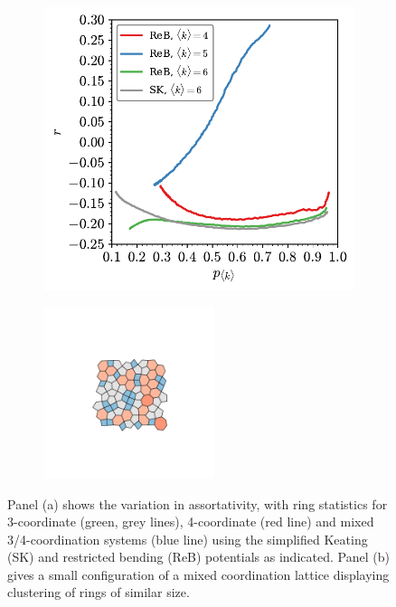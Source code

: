 \begin{figure}[bt]
     \centering
     
      \begin{subfigure}[b]{0.45\textwidth}
         \centering
         \includegraphics[width=\textwidth]{./figures/general_networks/mix_assort.pdf}
         \caption{}
         \label{fig:assortmixa}
     \end{subfigure}
     \hfill
     \begin{subfigure}[b]{0.45\textwidth}
         \centering
         \includegraphics[height=5cm]{./figures/general_networks/cairo.pdf}
         \caption{}
         \label{fig:assortmixb}
     \end{subfigure}
     \hfill
     
     \caption{Panel (a) shows the variation in assortativity, with ring statistics for 3\--coordinate (green, grey lines), 4\--coordinate (red line) and mixed 3/4\--coordination systems (blue line) using the simplified Keating (SK) and restricted bending (ReB) potentials as indicated. Panel (b) gives a small configuration of a mixed coordination lattice displaying clustering of rings of similar size.}
     \label{fig:assortmix}
\end{figure}

